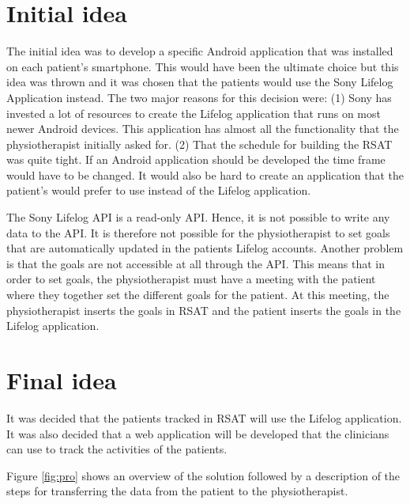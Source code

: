 \documentclass{cslthse-msc}
\begin{document}
\section{Initial idea}
The initial idea was to develop a specific Android application that was installed on each patient’s smartphone. This would have been the ultimate choice but this idea was thrown and it was chosen that the patients would use the Sony Lifelog Application instead. The two major reasons for this decision were: (1) Sony has invested a lot of resources to create the Lifelog application that runs on most newer Android devices. This application has almost all the functionality that the physiotherapist initially asked for.
(2) That the schedule for building the RSAT was quite tight. If an Android application should be developed the time frame would have to be changed. It would also be hard to create an application that the patient’s would prefer to use instead of the Lifelog application.

The Sony Lifelog API is a read-only API. Hence, it is not possible to write any data to the API. It is therefore not possible for the physiotherapist to set goals that are automatically updated in the patients Lifelog accounts. Another problem is that the goals are not accessible at all through the API. This means that in order to set goals, the physiotherapist must have a meeting with the patient where they together set the different goals for the patient. At this meeting, the physiotherapist inserts the goals in RSAT and the patient inserts the goals in the Lifelog application. 

\section{Final idea}
\label{sec:proposed-solution}
It was decided that the patients tracked in RSAT will use the Lifelog application. It was also decided that a web application will be developed that the clinicians can use to track the activities of the patients.

Figure \ref{fig:pro} shows an overview of the solution followed by a description of the steps for transferring the data from the patient to the physiotherapist.
\end{document}
